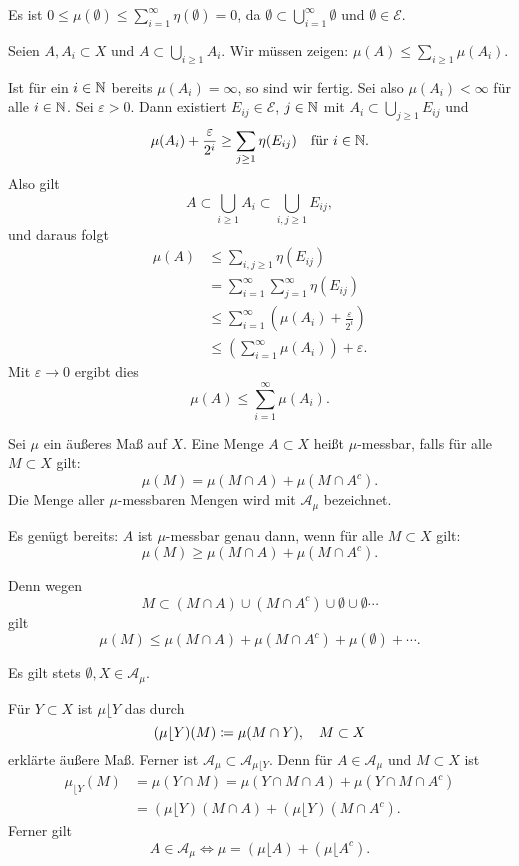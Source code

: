 \documentclass[a4paper,twoside,DIV15,BCOR12mm]{scrbook}
\newcommand{\A}{\mathcal A}
\newcommand{\MR}{\lfloor}
\begin{document}
\begin{beweis}
Es ist $0\le \mu(\emptyset) \le \sum_{i=1}^\infty \eta(\emptyset)=0$, da $\emptyset \subset \bigcup_{i=1}^\infty\emptyset$ und $\emptyset\in\mathcal E$.

Seien $A, A_i\subset X$ und $A\subset \bigcup_{i\ge1}A_i$. Wir müssen zeigen: $\mu(A) \le \sum_{i\ge 1}\mu(A_i)$.

Ist für ein $i\in\mathbb{N}$ bereits $\mu(A_i)=\infty$, so sind wir fertig. Sei also $\mu(A_i)<\infty$ für alle $i\in\mathbb{N}$. Sei $\varepsilon>0$. Dann existiert $E_{ij}\in \mathcal E$, $j\in \mathbb{N}$ mit $A_i\subset \bigcup_{j\ge 1} E_{ij}$ und
\[
\mu(A_i) + \frac{\varepsilon}{2^i}\ge \sum_{j\ge 1}\eta(E_{ij}) \quad \text{für $i\in \mathbb{N}$}.
\]
Also gilt
\[
A \subset \bigcup_{i\ge 1} A_i \subset \bigcup_{i,j\ge 1} E_{ij},
\]
und daraus folgt
\begin{align*}
\mu(A) &\le \sum_{i,j\ge 1}\eta(E_{ij}) \\
&= \sum_{i=1}^\infty \sum_{j=1}^\infty \eta(E_{ij}) \\
&\le \sum_{i=1}^\infty (\mu(A_i) + \frac\varepsilon{2^i}) \\
&\le \left( \sum_{i=1}^\infty \mu(A_i) \right) + \varepsilon.
\end{align*}
Mit $\varepsilon \to 0$ ergibt dies
\[
\mu(A) \le \sum_{i=1}^\infty \mu(A_i).
\]
\end{beweis}

\begin{definition}
Sei $\mu$ ein äußeres Maß auf $X$. Eine Menge $A\subset X$ heißt $\mu$-messbar, falls für alle $M\subset X$ gilt:
\[
\mu(M) = \mu(M\cap A) + \mu(M \cap A^c).
\]
Die Menge aller $\mu$-messbaren Mengen wird mit $\A_\mu$ bezeichnet.
\end{definition}

Es genügt bereits: $A$ ist $\mu$-messbar genau dann, wenn für alle $M\subset X$ gilt:
\[
\mu(M) \ge \mu(M\cap A) + \mu(M\cap A^c).
\]

Denn wegen
\[
M\subset (M\cap A) \cup (M\cap A^c) \cup \emptyset \cup \emptyset\cdots
\]
gilt 
\[
\mu(M)\le \mu(M\cap A) + \mu(M\cap A^c) + \mu(\emptyset) + \cdots.
\]

Es gilt stets $\emptyset, X\in\A_\mu$.

\begin{bemerkung}
Für $Y\subset X$ ist $\mu \MR Y$ das durch
\[
(\mu \MR Y)(M) \da \mu(M\cap Y),\quad M\subset X
\]
erklärte äußere Maß. Ferner ist $\A_\mu \subset \A_{\mu \MR Y}$. Denn für $A\in\A_\mu$ und $M\subset X$ ist
\begin{align*}
\mu_{\MR Y}(M)
&= \mu(Y\cap M) = \mu(Y\cap M\cap A) + \mu(Y\cap M \cap A^c) \\
&= (\mu \MR Y) (M\cap A) + (\mu \MR Y)(M\cap A^c).
\end{align*}
Ferner gilt
\[
A \in \A_\mu \iff \mu= (\mu \MR A) + (\mu \MR  A^c).
\]
\end{bemerkung}
\end{document}
